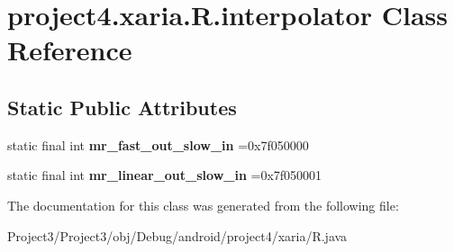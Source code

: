 \hypertarget{classproject4_1_1xaria_1_1R_1_1interpolator}{}\section{project4.\+xaria.\+R.\+interpolator Class Reference}
\label{classproject4_1_1xaria_1_1R_1_1interpolator}
\subsection*{Static Public Attributes}
\begin{DoxyCompactItemize}
\item 
\mbox{\label{classproject4_1_1xaria_1_1R_1_1interpolator_a6d11068ef827dff9a9e9535f3852b439}} 
static final int {\bfseries mr\+\_\+fast\+\_\+out\+\_\+slow\+\_\+in} =0x7f050000
\item 
\mbox{\label{classproject4_1_1xaria_1_1R_1_1interpolator_a3152c2059abbf3ddbfa9f23a2c4f82e8}} 
static final int {\bfseries mr\+\_\+linear\+\_\+out\+\_\+slow\+\_\+in} =0x7f050001
\end{DoxyCompactItemize}


The documentation for this class was generated from the following file\+:\begin{DoxyCompactItemize}
\item 
Project3/\+Project3/obj/\+Debug/android/project4/xaria/R.\+java\end{DoxyCompactItemize}
